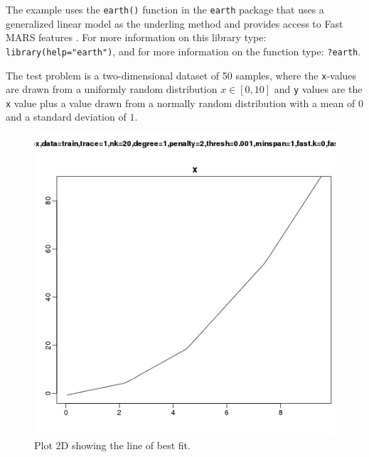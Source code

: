 The example uses the \texttt{earth()} function in the \texttt{earth} package that uses a generalized linear model as the underling method and provides access to Fast MARS features \cite{Milborrow2012}. For more information on this library type: \texttt{library(help="earth")}, and for more information on the function type: \texttt{?earth}.

The test problem is a two-dimensional dataset of 50 samples, where the \texttt{x}-values are drawn from a uniformly random distribution $x \in [0,10]$ and \texttt{y} values are the \texttt{x} value plus a value drawn from a normally random distribution with a mean of $0$ and a standard deviation of $1$.



\begin{figure}[htp]
\centering
\includegraphics[scale=0.45]{a_regression/multivariate_adaptive_regression_splines_result.png}
\caption{Plot 2D showing the line of best fit.}
\label{plot:multivariate_adaptive_regression_splines_result}
\end{figure}

